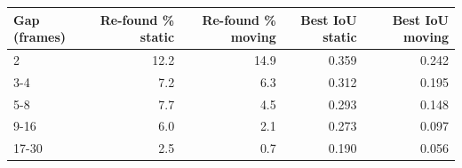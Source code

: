 \begin{tabular}{lrrrr}
\toprule
Gap (frames) & Re-found \% static & Re-found \% moving & Best IoU static & Best IoU moving \\
\midrule
2 & 12.2 & 14.9 & 0.359 & 0.242 \\
3-4 & 7.2 & 6.3 & 0.312 & 0.195 \\
5-8 & 7.7 & 4.5 & 0.293 & 0.148 \\
9-16 & 6.0 & 2.1 & 0.273 & 0.097 \\
17-30 & 2.5 & 0.7 & 0.190 & 0.056 \\
\bottomrule
\end{tabular}
